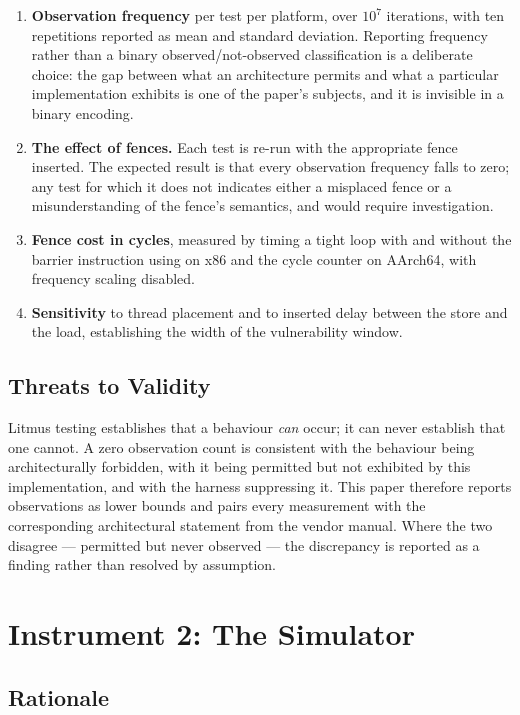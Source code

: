 \begin{enumerate}
\item \textbf{Observation frequency} per test per platform, over $10^7$
  iterations, with ten repetitions reported as mean and standard deviation.
  Reporting frequency rather than a binary observed/not-observed classification is
  a deliberate choice: the gap between what an architecture permits and what a
  particular implementation exhibits is one of the paper's subjects, and it is
  invisible in a binary encoding.
\item \textbf{The effect of fences.} Each test is re-run with the appropriate
  fence inserted. The expected result is that every observation frequency falls to
  zero; any test for which it does not indicates either a misplaced fence or a
  misunderstanding of the fence's semantics, and would require investigation.
\item \textbf{Fence cost in cycles}, measured by timing a tight loop with and
  without the barrier instruction using  on x86 and the cycle counter
  on AArch64, with frequency scaling disabled.
\item \textbf{Sensitivity} to thread placement and to inserted delay between the
  store and the load, establishing the width of the vulnerability window.
\end{enumerate}

\subsection{Threats to Validity}

Litmus testing establishes that a behaviour \emph{can} occur; it can never
establish that one cannot.
A zero observation count is consistent with the
behaviour being architecturally forbidden, with it being permitted but not
exhibited by this implementation, and with the harness suppressing it.
This
paper therefore reports observations as lower bounds and pairs every measurement
with the corresponding architectural statement from the vendor manual. Where the
two disagree --- permitted but never observed --- the discrepancy is reported as a
finding rather than resolved by assumption.

\section{Instrument 2: The Simulator}
\label{sec:sim-method}

\subsection{Rationale}

